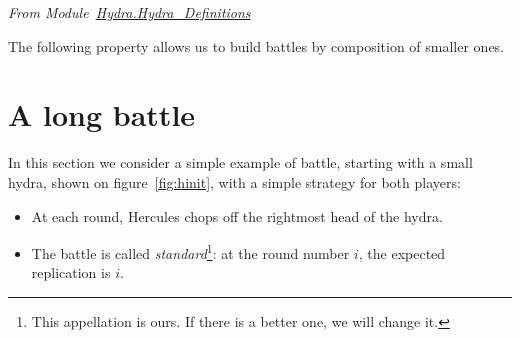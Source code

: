 \vspace{4pt}
\emph{From Module~\href{../theories/html/hydras.Hydra.Hydra_Definitions.html\#fight}{Hydra.Hydra\_Definitions}}




The following property allows us to build battles by composition of smaller ones.







 




\section{A long battle}
\label{sect:big-battle}


In this section we consider a simple example of battle, starting with a small hydra,
shown on figure~\vref{fig:hinit}, with a simple strategy for both players:

\begin{itemize}
\item At each round, Hercules chops off the rightmost head of the hydra.
\item The battle is called \emph{standard}\footnote{This appellation is ours. If there is a better one, we will change it.}: at the round number $i$, the expected replication is $i$.
\end{itemize}



